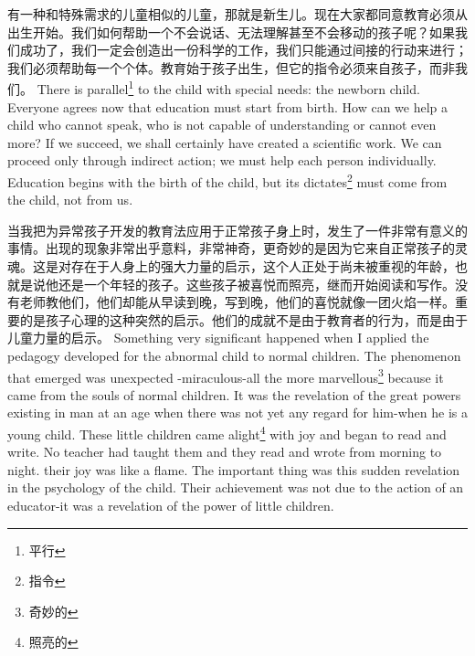 \documentclass[lang=cn,10pt]{elegantbook}
\begin{document}
\begin{tcolorbox}[title=译文,
colback=red!5!white,
colframe=red!75!black,
fonttitle=\bfseries]
有一种和特殊需求的儿童相似的儿童，那就是新生儿。现在大家都同意教育必须从出生开始。我们如何帮助一个不会说话、无法理解甚至不会移动的孩子呢？如果我们成功了，我们一定会创造出一份科学的工作，我们只能通过间接的行动来进行；我们必须帮助每一个个体。教育始于孩子出生，但它的指令必须来自孩子，而非我们。
There is parallel\footnote{平行} to the child with special needs: the newborn child. Everyone agrees now that education must start from birth. How can we help a child who cannot speak, who is not capable of understanding or cannot even more? If we succeed, we shall certainly have created a scientific work. We can proceed only through indirect action; we must help each person individually. Education begins with the birth of the child, but its dictates\footnote{指令} must come from the child, not from us.
\end{tcolorbox}

\begin{tcolorbox}[title=译文,
colback=red!5!white,
colframe=red!75!black,
fonttitle=\bfseries]
当我把为异常孩子开发的教育法应用于正常孩子身上时，发生了一件非常有意义的事情。出现的现象非常出乎意料，非常神奇，更奇妙的是因为它来自正常孩子的灵魂。这是对存在于人身上的强大力量的启示，这个人正处于尚未被重视的年龄，也就是说他还是一个年轻的孩子。这些孩子被喜悦而照亮，继而开始阅读和写作。没有老师教他们，他们却能从早读到晚，写到晚，他们的喜悦就像一团火焰一样。重要的是孩子心理的这种突然的启示。他们的成就不是由于教育者的行为，而是由于儿童力量的启示。
Something very significant happened when I applied the pedagogy developed for the abnormal child to normal children. The phenomenon that emerged was unexpected -miraculous-all the more marvellous\footnote{奇妙的} because it came from the souls of normal children. It was the revelation of the great powers existing in man at an age when there was not yet any regard for him-when he is a young child. These little children came alight\footnote{照亮的} with joy and began to read and write. No teacher had taught them and they read and wrote from morning to night. their joy was like a flame. The important thing was this sudden revelation in the psychology of the child. Their achievement was not due to the action of an educator-it was a revelation of the power of little children.
\end{tcolorbox}
\end{document}
